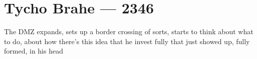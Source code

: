 \hypertarget{tycho-brahe-2346}{%
\chapter{Tycho Brahe — 2346}\label{tycho-brahe-2346}}

The DMZ expands, sets up a border crossing of sorts, starts to think about what to do, about how there's this idea that he invest fully that just showed up, fully formed, in his head
